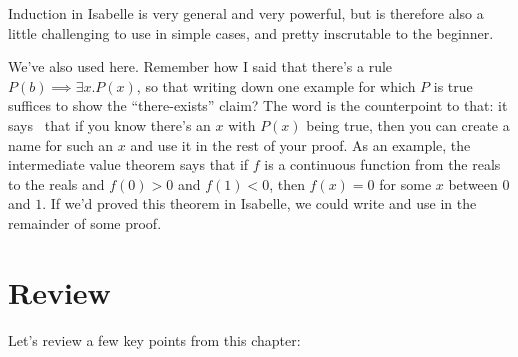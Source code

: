 Induction in Isabelle is very general and very powerful, but is therefore also a little challenging to use in simple cases, and pretty inscrutable to the beginner.

We've also used  here. Remember how I said that there's a rule $P(b) \implies \exists x . P(x)$, so that writing down one example for which $P$ is true suffices to show the ``there-exists'' claim? The word  is the counterpoint to that: it says  that if you know there's an $x$ with $P(x)$ being true, then you can create a name for such an $x$ and use it in the rest of your proof. As an example, the intermediate value theorem says that if $f$ is a continuous function from the reals to the reals and $f(0) > 0$ and $f(1) < 0$, then $f(x) = 0$ for some $x$ between $0$ and $1$. If we'd proved this theorem in Isabelle, we could write  and use  in the remainder of some proof.  

\section{Review}
Let's review a few key points from this chapter:

